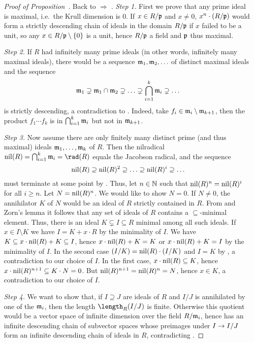 \documentclass[a4paper,parskip=half,numbers=enddot, DIV=12, headheight=30pt]{scrreprt}
\begin{document}
\begin{proof}[Proof of Proposition~]
    Back to  $\Rightarrow$ . \emph{Step 1.} First we prove that any prime ideal is maximal, i.e.\ the Krull dimension is $0$. If $x\in R/\mathfrak{p}$ and $x\neq 0$, $x^n\cdot(R/\mathfrak{p})$ would form a strictly descending chain of ideals in the domain $R/\mathfrak{p}$ if $x$ failed to be a unit, so any $x\in R/\mathfrak{p}\setminus\{0\}$ is a unit, hence $R/\mathfrak{p}$ a field and $\mathfrak{p}$ thus maximal. 
    
    \emph{Step 2.} If $R$ had infinitely many prime ideals (in other words, infinitely many maximal ideals), there would be a sequence $\mathfrak{m}_1,\mathfrak{m}_2,\ldots$ of distinct maximal ideals and the sequence
    \begin{align*}
        \mathfrak{m}_1 \supsetneq \mathfrak{m}_1\cap\mathfrak{m}_2\supsetneq \ldots\supsetneq \bigcap_{i=1}^k \mathfrak{m}_i \supsetneq \ldots
    \end{align*}
    is strictly descending, a contradiction to . Indeed, take $f_i\in\mathfrak{m}_i\setminus \mathfrak{m}_{k+1}$, then the product $f_1\cdots f_k$ is in $\bigcap_{i=1}^k\mathfrak{m}_i$ but not in $\mathfrak{m}_{k+1}$.
    
    \emph{Step 3.} Now assume there are only finitely many distinct prime (and thus maximal) ideals $\mathfrak{m}_1, \ldots,\mathfrak{m}_k$ of $R$. Then the nilradical $\nil(R) = \bigcap_{i=1}^k \mm_i=\rad(R)$ equals the Jacobson radical, and the sequence 
    \begin{align*}
    	\operatorname{nil}(R)\supseteq\operatorname{nil}(R)^2\supseteq \ldots\supseteq\operatorname{nil}(R)^i\supseteq\ldots 
    \end{align*}
    must terminate at some point by . Thus, let $n\in\mathbb{N}$ such that $\operatorname{nil}(R)^n = \operatorname{nil}(R)^i$ for all $i\geq n$. Let $N = \operatorname{nil}(R)^n$. We would like to show $N=0$. If $N\neq 0$, the annihilator $K$ of $N$ would be an ideal of $R$ strictly contained in $R$. From  and Zorn's lemma it follows that any set of ideals of $R$ contains a $\subseteq$-minimal element. Thus, there is an ideal $K\subsetneq I\subseteq R$ minimal among all such ideals. If $x\in I\setminus K$ we have $I= K+x\cdot R$ by the minimality of $I$. We have $K\subseteq x\cdot \operatorname{nil}(R) + K \subseteq I$, hence $x\cdot  \operatorname{nil}(R) + K = K$ or $x\cdot \operatorname{nil}(R) +K = I$ by the minimality of $I$. In the second case $(I/K) = \operatorname{nil}(R)\cdot(I/K)$ and $I=K$ by \NAK, a contradiction to our choice of $I$. In the first case, $x\cdot \operatorname{nil}(R) \subseteq K$, hence $x\cdot \operatorname{nil}(R)^{n+1}\subseteq K\cdot N = 0$. But $\operatorname{nil}(R)^{n+1}= \operatorname{nil}(R)^n = N$, hence $x\in K$, a contradiction to our choice of $I$. 
    
    \emph{Step 4.} We want to show that, if $I\supseteq J$ are ideals of $R$ and $I/J$ is annihilated by one of the $\mathfrak{m}_i$, then the length $\length_R(I/J)$ is finite. Otherwise this quotient would be a vector space of infinite dimension over the field $R/\mathfrak{m}_i$, hence has an infinite descending chain of subvector spaces whose preimages under $I\morphism I/J$ form an infinite descending chain of ideals in $R$, contradicting . 
    

\end{proof}
\end{document}
